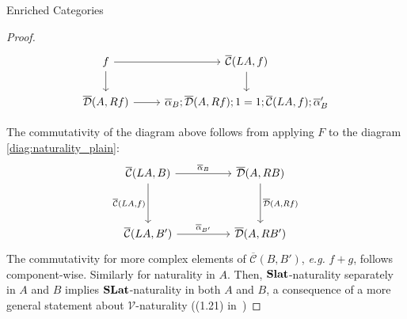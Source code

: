 \documentclass[acmsmall, screen, nonacm]{acmart}
\newcommand\enriched[1]{{\overline{\mathcal{#1}}}}
\begin{document}
\begin{section}{Enriched Categories}
\begin{proof}
\[
\begin{tikzcd}
	f & {\enriched{C}(LA,f)} \\
	{\enriched{D}(A,Rf)} & {\overline{\alpha}_{B};\enriched{D}(A,Rf);1 = 1;\enriched{C}(LA,f);\overline{\alpha}_{B}'}
	\arrow[from=1-1, to=1-2]
	\arrow[from=1-1, to=2-1]
	\arrow[from=1-2, to=2-2]
	\arrow[from=2-1, to=2-2]
\end{tikzcd}
\]

The commutativity of the diagram above follows from applying $F$ to the diagram \ref{diag:naturality_plain}:
\[\begin{tikzcd}
	{\enriched{C}(LA,B)} && {\enriched{D}(A,RB)} \\
	\\
	{\enriched{C}(LA,B')} && {\enriched{D}(A,RB')}
	\arrow["{\overline{\alpha}_{B}}", from=1-1, to=1-3]
	\arrow["{\enriched{C}(LA,f)}"', from=1-1, to=3-1]
	\arrow["{\enriched{D}(A,Rf)}", from=1-3, to=3-3]
	\arrow["{\overline{\alpha}_{B'}}", from=3-1, to=3-3]
\end{tikzcd}
\]
The commutativity for more complex elements of $\enriched{C}(B,B')$, \textit{e.g.} $f + g$, follows component-wise.
Similarly for naturality in $A$.
Then, $\mathbf{Slat}$-naturality separately in $A$ and $B$ implies $\mathbf{SLat}$-naturality in both $A$ and $B$, a consequence of a more general statement about $\mathcal{V}$-naturality ((1.21) in~\cite{Kelly2022BASICCO})

\end{proof}


\end{section}
\end{document}
